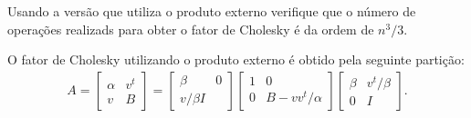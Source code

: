 \begin{questions}
     Usando a vers\~{a}o que utiliza o produto externo verifique que o n\'{u}mero de opera\c{c}\~{o}es realizads para obter o fator de Cholesky \'{e} da ordem de $n^3 / 3$.
    \begin{solution}
        O fator de Cholesky utilizando o produto externo \'{e} obtido pela seguinte parti\c{c}\~{a}o:
        \begin{align*}
            A = \begin{bmatrix}
                \alpha & v^t \\
                v & B
            \end{bmatrix} = \begin{bmatrix}
                \beta & 0 \\
                v / \beta I
            \end{bmatrix} \begin{bmatrix}
                1 & 0 \\
                0 & B - v v^t / \alpha
            \end{bmatrix} \begin{bmatrix}
                \beta & v^t / \beta \\
                0 & I
            \end{bmatrix}.
        \end{align*}


\end{solution}
\end{questions}
